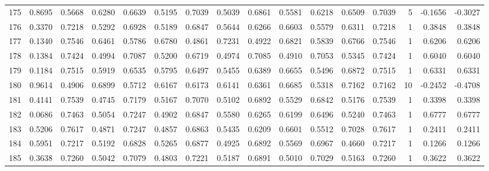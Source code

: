 \begin{tabular}{lrrrrrrrrrrrrrrr}
175 &      0.8695 &  0.5668 &  0.6280 &  0.6639 &  0.5195 &  0.7039 &  0.5039 &  0.6861 &  0.5581 &  0.6218 &   0.6509 &     0.7039 &      5 &                   -0.1656 &                    -0.3027 \\
176 &      0.3370 &  0.7218 &  0.5292 &  0.6928 &  0.5189 &  0.6847 &  0.5644 &  0.6266 &  0.6603 &  0.5579 &   0.6311 &     0.7218 &      1 &                    0.3848 &                     0.3848 \\
177 &      0.1340 &  0.7546 &  0.6461 &  0.5786 &  0.6780 &  0.4861 &  0.7231 &  0.4922 &  0.6821 &  0.5839 &   0.6766 &     0.7546 &      1 &                    0.6206 &                     0.6206 \\
178 &      0.1384 &  0.7424 &  0.4994 &  0.7087 &  0.5200 &  0.6719 &  0.4974 &  0.7085 &  0.4910 &  0.7053 &   0.5345 &     0.7424 &      1 &                    0.6040 &                     0.6040 \\
179 &      0.1184 &  0.7515 &  0.5919 &  0.6535 &  0.5795 &  0.6497 &  0.5455 &  0.6389 &  0.6655 &  0.5496 &   0.6872 &     0.7515 &      1 &                    0.6331 &                     0.6331 \\
180 &      0.9614 &  0.4906 &  0.6899 &  0.5712 &  0.6167 &  0.6173 &  0.6141 &  0.6361 &  0.6685 &  0.5318 &   0.7162 &     0.7162 &     10 &                   -0.2452 &                    -0.4708 \\
181 &      0.4141 &  0.7539 &  0.4745 &  0.7179 &  0.5167 &  0.7070 &  0.5102 &  0.6892 &  0.5529 &  0.6842 &   0.5176 &     0.7539 &      1 &                    0.3398 &                     0.3398 \\
182 &      0.0686 &  0.7463 &  0.5054 &  0.7247 &  0.4902 &  0.6847 &  0.5580 &  0.6265 &  0.6199 &  0.6496 &   0.5240 &     0.7463 &      1 &                    0.6777 &                     0.6777 \\
183 &      0.5206 &  0.7617 &  0.4871 &  0.7247 &  0.4857 &  0.6863 &  0.5435 &  0.6209 &  0.6601 &  0.5512 &   0.7028 &     0.7617 &      1 &                    0.2411 &                     0.2411 \\
184 &      0.5951 &  0.7217 &  0.5192 &  0.6828 &  0.5265 &  0.6877 &  0.4925 &  0.6892 &  0.5569 &  0.6967 &   0.4660 &     0.7217 &      1 &                    0.1266 &                     0.1266 \\
185 &      0.3638 &  0.7260 &  0.5042 &  0.7079 &  0.4803 &  0.7221 &  0.5187 &  0.6891 &  0.5010 &  0.7029 &   0.5163 &     0.7260 &      1 &                    0.3622 &                     0.3622 \\

\end{tabular}
